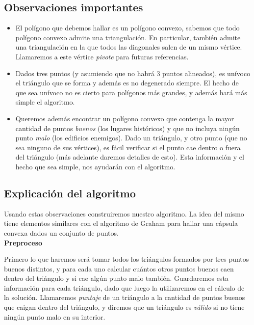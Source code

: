 \subsection{Observaciones importantes}
\begin{itemize}
\item El polígono que debemos hallar es un polígono convexo, sabemos que todo 
polígono convexo admite una triangulación. En particular, también admite una triangulación 
en la que todos las diagonales salen de un mismo vértice. Llamaremos a este vértice \textit{pivote} 
para futuras referencias. 
\item Dados tres puntos (y asumiendo que no habrá 3 puntos alineados), es unívoco el triángulo que se 
forma y además es no degenerado siempre. El hecho de que sea unívoco no es cierto para polígonos más 
grandes, y además hará más simple el algoritmo. 
\item Queremos además encontrar un polígono convexo que contenga la mayor cantidad de puntos \textit{buenos} 
(los lugares históricos) y que no incluya ningún punto \textit{malo} (los edificios enemigos). 
Dado un triángulo, y otro punto (que no sea ninguno de sus vértices), es fácil verificar si el punto 
cae dentro o fuera del triángulo (más adelante daremos detalles de esto). Esta información y el 
hecho que sea simple, nos ayudarán con el algoritmo. 
\end{itemize}

\subsection{Explicación del algoritmo}
Usando estas observaciones construiremos nuestro algoritmo. La idea del mismo tiene elementos similares 
con el algoritmo de Graham para hallar una cápsula convexa dados un conjunto de puntos. \\

\textbf{Preproceso}

Primero lo que haremos será tomar todos los triángulos formados por tres puntos buenos distintos, 
y para cada uno calcular cuántos otros puntos buenos caen dentro del triángulo y si cae algún punto malo 
también. Guardaremos esta información para cada triángulo, dado que luego la utilizaremos en 
el cálculo de la solución. Llamaremos \textit{puntaje} de un triángulo a la cantidad de puntos buenos 
que caigan dentro del triángulo, y diremos que un triángulo es \textit{válido} si no tiene 
ningún punto malo en su interior. 

